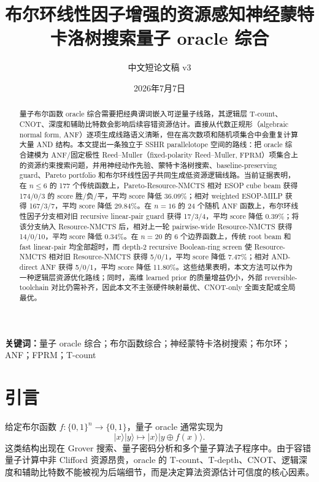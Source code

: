 \documentclass[UTF8,fontset=macnew,11pt]{ctexart}
\title{布尔环线性因子增强的资源感知神经蒙特卡洛树搜索量子 oracle 综合}
\author{中文短论文稿 v3}
\date{2026年7月7日}
\newcommand{\method}{Resource-NMCTS}
\newcommand{\pareto}{Pareto-Resource-NMCTS}
\newcommand{\anf}{\ensuremath{\mathrm{ANF}}}
\newcommand{\fprm}{\ensuremath{\mathrm{FPRM}}}
\begin{document}
\maketitle

\begin{abstract}
量子布尔函数 oracle 综合需要把经典谓词嵌入可逆量子线路，其逻辑层 T-count、CNOT、深度和辅助比特数会影响后续容错资源估计。直接从代数正规形（algebraic normal form, \anf{}）逐项生成线路语义清晰，但在高次数项和随机项集合中会重复计算大量 AND 结构。本文提出一条独立于 SSHR parallelotope 空间的路线：把 oracle 综合建模为 \anf{}/固定极性 Reed--Muller（fixed-polarity Reed--Muller, \fprm{}）项集合上的资源约束搜索问题，并用神经动作先验、蒙特卡洛树搜索、baseline-preserving guard、Pareto portfolio 和布尔环线性因子共同生成低资源逻辑线路。当前证据表明，在 $n\leq6$ 的 177 个传统函数上，\pareto{} 相对 ESOP cube beam 获得 174/0/3 的 score 胜/负/平，平均 score 降低 36.09\%；相对 weighted ESOP-MILP 获得 167/3/7，平均 score 降低 29.84\%。在 $n=16$ 的 24 个随机 \anf{} 函数上，布尔环线性因子分支相对旧 recursive linear-pair guard 获得 17/3/4，平均 score 降低 0.39\%；将该分支纳入 \method{} 后，相对上一轮 pairwise-wide \method{} 获得 14/0/10，平均 score 降低 0.34\%。在 $n=20$ 的 6 个边界函数上，传统 root beam 和 fast linear-pair 均全部超时，而 depth-2 recursive Boolean-ring screen 使 \method{} 相对旧 \method{} 获得 5/0/1，平均 score 降低 7.47\%；相对 AND-direct ANF 获得 5/0/1，平均 score 降低 11.80\%。这些结果表明，本文方法可以作为一种逻辑层资源优化路线；同时，高维 learned prior 的质量增益仍小，外部 reversible-toolchain 对比仍需补齐，因此本文不主张硬件映射最优、CNOT-only 全面支配或全局最优。
\end{abstract}

\noindent\textbf{关键词：}量子 oracle 综合；布尔函数综合；神经蒙特卡洛树搜索；布尔环；ANF；FPRM；T-count

\section{引言}

给定布尔函数 $f:\{0,1\}^n\rightarrow\{0,1\}$，量子 oracle 通常实现为
\begin{equation}
  |x\rangle |y\rangle \mapsto |x\rangle |y\oplus f(x)\rangle .
  \label{eq:oracle}
\end{equation}
这类结构出现在 Grover 搜索、量子密码分析和多个量子算法子程序中。由于容错量子计算中非 Clifford 资源昂贵，oracle 的 T-count、T-depth、CNOT、逻辑深度和辅助比特数不能被视为后端细节，而是决定算法资源估计可信度的核心因素。
\end{document}

